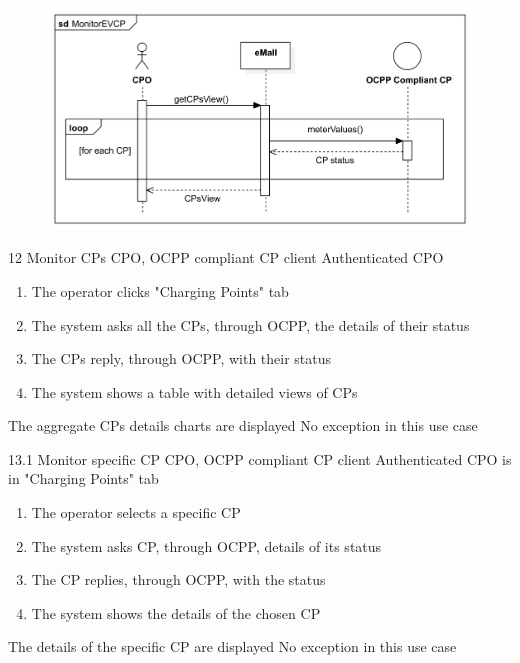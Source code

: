 \usecase
{
    \begin{figure}[H]
        \centering
        \includegraphics[scale=0.9]{src/sequence_diagram/monitorEVCP.png}
    \end{figure}
}
{12}
{Monitor CPs} %
{CPO, OCPP compliant CP client} %
{Authenticated CPO} %
{ %
    \begin{enumerate}
        \item The operator clicks "Charging Points" tab
        \item The system asks all the CPs, through OCPP, the details of their status
        \item The CPs reply, through OCPP, with their status
        \item The system shows a table with detailed views of CPs
    \end{enumerate}
}
{The aggregate CPs details charts are displayed} %
{ %
    No exception in this use case
}
{ %
}

\usecase
{

}
{13.1}
{Monitor specific CP} %
{CPO, OCPP compliant CP client} %
{Authenticated CPO is in "Charging Points" tab} %
{ %
    \begin{enumerate}
        \item The operator selects a specific CP
        \item The system asks CP, through OCPP, details of its status
        \item The CP replies, through OCPP, with the status
        \item The system shows the details of the chosen CP
    \end{enumerate}
}
{The details of the specific CP are displayed} %
{ %
    No exception in this use case
}
{ %
}

